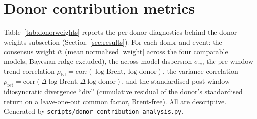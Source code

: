 \section{Donor contribution metrics}\label{app:donorweights}
Table~\ref{tab:donorweights} reports the per-donor diagnostics behind the donor-weights
subsection (Section~\ref{sec:results}). For each donor and event: the consensus weight
$\bar w$ (mean normalised $|$weight$|$ across the four comparable models, Bayesian ridge
excluded), the across-model dispersion $\sigma_w$, the pre-window trend correlation
$\rho_{\text{lvl}}=\mathrm{corr}(\log\text{Brent},\log\text{donor})$, the variance
correlation $\rho_{\text{ret}}=\mathrm{corr}(\Delta\log\text{Brent},\Delta\log\text{donor})$,
and the standardised post-window idiosyncratic divergence ``div'' (cumulative residual of
the donor's standardised return on a leave-one-out common factor, Brent-free). All are
descriptive. Generated by \texttt{scripts/donor\_contribution\_analysis.py}.

